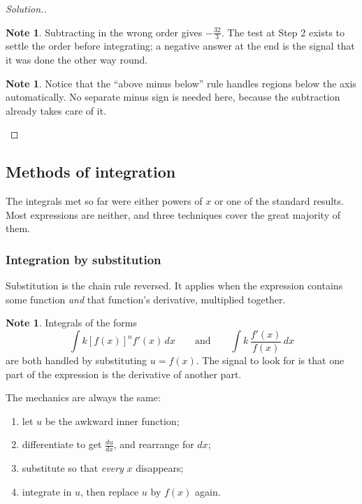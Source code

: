 \documentclass[11pt,a4paper]{article}
\theoremstyle{definition}
\newtheorem{note}[thm]{Note}
\newenvironment{solution}
  {\renewcommand{\qedsymbol}{}\begin{proof}[\textit{Solution}.]}
  {\end{proof}}
\begin{document}
\begin{solution}
\begin{note}
Subtracting in the wrong order gives $-\frac{32}{3}$. The test at Step 2 exists to
settle the order before integrating; a negative answer at the end is the signal that it
was done the other way round.
\end{note}

\begin{note}
Notice that the ``above minus below'' rule handles regions below the axis automatically.
No separate minus sign is needed here, because the subtraction already takes care of it.
\end{note}
\end{solution}

\subsection{Methods of integration}

The integrals met so far were either powers of $x$ or one of the standard results. Most
expressions are neither, and three techniques cover the great majority of them.

\subsubsection{Integration by substitution}

Substitution is the chain rule reversed. It applies when the expression contains some
function \emph{and} that function's derivative, multiplied together.

\begin{note}
Integrals of the forms
$$\int k\left[f(x)\right]^n f'(x)\,dx\qquad\text{and}\qquad\int k\,\frac{f'(x)}{f(x)}\,dx$$
are both handled by substituting $u=f(x)$. The signal to look for is that one part of
the expression is the derivative of another part.
\end{note}

The mechanics are always the same:
\begin{enumerate}
\item[(i).] let $u$ be the awkward inner function;
\item[(ii).] differentiate to get $\frac{du}{dx}$, and rearrange for $dx$;
\item[(iii).] substitute so that \emph{every} $x$ disappears;
\item[(iv).] integrate in $u$, then replace $u$ by $f(x)$ again.
\end{enumerate}
\end{document}
